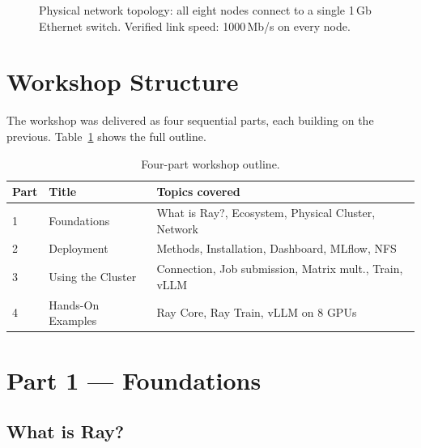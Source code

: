 \documentclass[12pt,a4paper]{article}
\begin{document}
\begin{figure}[H]
\begin{mdframed}[style=slidebox]
\begin{center}
\end{center}
\end{mdframed}
\caption{Physical network topology: all eight nodes connect to a single 1\,Gb
  Ethernet switch. Verified link speed: 1000\,Mb/s on every node.}
\label{fig:network}
\end{figure}

\section{Workshop Structure}

The workshop was delivered as four sequential parts, each building on
the previous. Table~\ref{tab:outline} shows the full outline.

\begin{table}[H]
\centering
\caption{Four-part workshop outline.}
\label{tab:outline}
\begin{tabular}{lll}
\toprule
\textbf{Part} & \textbf{Title} & \textbf{Topics covered} \\
\midrule
1 & Foundations     & What is Ray?, Ecosystem, Physical Cluster, Network \\
2 & Deployment      & Methods, Installation, Dashboard, MLflow, NFS \\
3 & Using the Cluster & Connection, Job submission, Matrix mult., Train, vLLM \\
4 & Hands-On Examples & Ray Core, Ray Train, vLLM on 8 GPUs \\
\bottomrule
\end{tabular}
\end{table}

\section{Part 1 --- Foundations}

\subsection{What is Ray?}
\end{document}
